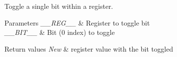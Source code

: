 Toggle a single bit within a register. 


\begin{DoxyParams}{Parameters}
{\em \+\_\+\+\_\+\+R\+E\+G\+\_\+\+\_\+} & Register to toggle bit \\
\hline
{\em \+\_\+\+\_\+\+B\+I\+T\+\_\+\+\_\+} & Bit (0 index) to toggle \\
\hline
\end{DoxyParams}

\begin{DoxyRetVals}{Return values}
{\em New} & register value with the bit toggled \\
\hline
\end{DoxyRetVals}
